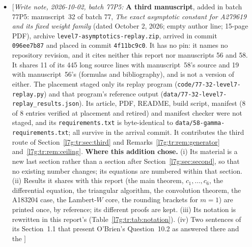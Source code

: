 \documentclass[11pt,letterpaper]{article}
\newcommand{\file}[1]{\nolinkurl{#1}}
\theoremstyle{remark}\newtheorem{remark}[theorem]{Remark}
\newcommand{\writenote}[1]{\textup{[}\emph{Write note, 2026-10-02, batch 77P5:} #1\textup{]}}
\newcounter{l7gtrsavedeq}
\begin{document}
\begin{itemize}[leftmargin=2em]
infinity, the Lambert-$W$ core, the $A183204$ constant), with manuscript~56's
distinct proofs and forms kept. (iii) Manuscript~56's notation was
rewritten in manuscript~58's (Section~\ref{l7g:sec:notation}). (iv) Both
abstracts were replaced by one; both title pages by one. (v)
Manuscript~56's reproducibility appendix, which lists its delivery file
names, is replaced by the report README. (vi) The two OEIS proposals are
both printed (Appendix~\ref{l7g:app:oeis}); manuscript~56's gains the
credit to O'Brien that manuscript~58's already had. (vii) The two
bibliographies are merged; five entries that manuscript~56 listed but
never cited (Cooper, Cox, Apostol, DLMF, Flajolet--Sedgewick) are now
cited where they are used.
\item \writenote{\textbf{A third manuscript}, added in batch 77P5:
manuscript~32 of batch 77, \emph{The exact asymptotic constant for A279619
and its fixed weight family} (dated October 2, 2026; empty author line;
15-page PDF), archive \texttt{level7-asymptotics-replay.zip}, arrived in
commit \texttt{096ee7b87} and placed in commit \texttt{4f11bc9c0}. It has
no pin: it names no repository revision, and it cites neither this report
nor manuscripts 56 and 58. It shares 11 of its 445 long source lines with
manuscript~58's source and 19 with manuscript~56's (formulas and
bibliography), and is not a version of either. The placement staged only
its replay program (\file{code/77-32-level7-replay.py}) and that program's
reference output (\file{data/77-32-level7-replay_results.json}). Its
article, PDF, README, build script, manifest (8 of 8 entries verified at
placement and retired) and manifest checker were not staged, and its
\file{requirements.txt} is byte-identical to
\file{data/58-gamma-requirements.txt}; all survive in the arrival
commit. It contributes the third route of Section~\ref{l7g:tr:sec:third}
and Remarks~\ref{l7g:tr:rem:generator} and~\ref{l7g:tr:rem:ceiling}.
\textbf{Where this addition chose.} (i) Its material is a new last section
rather than a section after Section~\ref{l7g:sec:second}, so that no
existing number changes; its equations are numbered within that section.
(ii) Results it shares with this report (the main theorem, $c_1,\dots,c_6$,
the differential equation, the triangular algorithm, the convolution
theorem, the A183204 case, the Lambert-$W$ core, the rounding brackets for
$m=1$) are printed once, by reference; its different proofs are kept.
(iii) Its notation is rewritten in this report's
(Table~\ref{l7g:tr:tab:notation}). (iv) Two sentences of its Section~1.1
that present O'Brien's Question~10.2 as answered there and the
}
\end{itemize}
\end{document}
